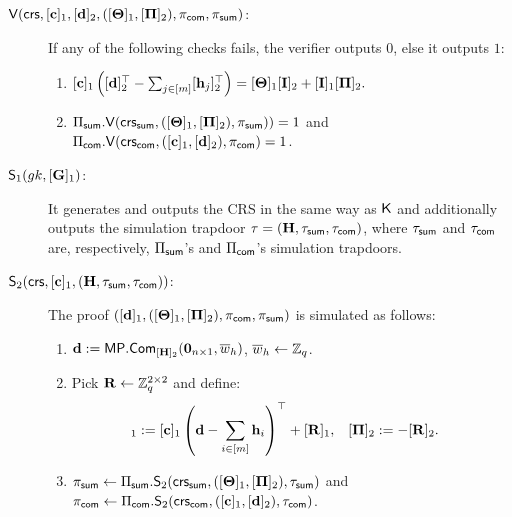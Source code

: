 \begin{description}
\item[{$\mathsf{V}(
    \mathsf{crs},
    [\mathbf{c}]_1,
    [\mathbf{d}]_2,
        ([\mathbf{{\Theta}}]_1, [\mathbf{{\Pi}}]_2), 
        \pi_{\mathsf{com}},\pi_{\mathsf{sum}} )$}:] If any of the following checks fails, the verifier outputs $0$, else it outputs $1$:
%   
\begin{enumerate}
\item 
$[\mathbf{c}]_1 \left([\mathbf{d}]_2^\top-
    \sum_{j \in [m]} [\mathbf{h}_j]_2^\top\right) =
    [\mathbf{{\Theta}}]_1 [\mathbf{{I}}]_2 +  [\mathbf{{I}}]_1 [\mathbf{{\Pi}}]_2.$
  \item $\Pi_{\mathsf{sum}}.\mathsf{V}(\mathsf{crs}_{\mathsf{sum}},([\mathbf{{\Theta}}]_1,[\mathbf{{\Pi}}]_2),\pi_{\mathsf{sum}}))=1$ and $\Pi_{\mathsf{com}}.\mathsf{V}(\mathsf{crs}_{\mathsf{com}},([\mathbf{c}]_1,[\mathbf{d}]_2),\pi_{\mathsf{com}})=1$.
\end{enumerate}

\item[{$\mathsf{S}_1({gk},[\mathbf{{G}}]_1)$}:] It generates and outputs the CRS in the same way as $\mathsf{K}$ and additionally outputs the simulation trapdoor 
$\tau=\left(\mathbf{{H}},\tau_{\mathsf{sum}}, \tau_{\mathsf{com}}\right)$,
where $\tau_{\mathsf{sum}}$ and $\tau_{\mathsf{com}}$ are, respectively, $\Pi_{\mathsf{sum}}$'s and $\Pi_{\mathsf{com}}$'s simulation trapdoors.
\item[{$\mathsf{S}_2(\mathsf{crs},[\mathbf{c}]_1,\left(\mathbf{{H}},\tau_{\mathsf{sum}}, \tau_{\mathsf{com}}\right))$}:] The proof $([\mathbf{d}]_1,([\mathbf{{\Theta}}]_1,[\mathbf{{\Pi}}]_2),\pi_{\mathsf{com}},\pi_{\mathsf{sum}})$ is simulated as follows:
\begin{enumerate}
\item $\mathbf{d}:= \mathsf{MP}.\mathsf{Com}_{[\mathbf{{H}}]_2}(\mathbf{0}_{n\times1},\overline{w}_h)$, $\overline{w}_h \gets \mathbb{Z}_q$.
\item Pick $\mathbf{{R}} \gets \mathbb{Z}_q^{2 \times 2}$ and define:
\begin{align*} 
[\matr{\Theta}]_1 & :=  [\vecb{c}]_1\left(\vecb{d}-\sum_{i \in [m]} \lrck_i\right)^\top + [\matr{R}]_1,
    &
[\matr{\Pi}]_2 & := - [\matr{R}]_2.
\end{align*}
\item $\pi_{\mathsf{sum}}\gets\Pi_{\mathsf{sum}}.\mathsf{S}_2(\mathsf{crs}_{\mathsf{sum}},([\mathbf{{\Theta}}]_1,[\mathbf{{\Pi}}]_2),\tau_{\mathsf{sum}})$ and $\pi_{\mathsf{com}}\gets\Pi_{\mathsf{com}}.\mathsf{S}_2(\mathsf{crs}_{\mathsf{com}},([\mathbf{c}]_1,[\mathbf{d}]_2),\tau_{\mathsf{com}})$.
\end{enumerate}
\end{description}


